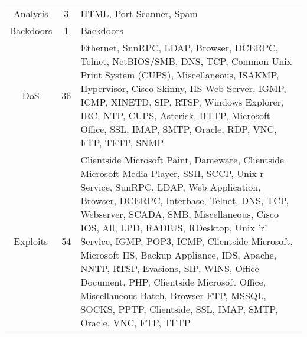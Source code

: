 \begin{table}[htbp]
\begin{tabularx}{\textwidth}{@{}ccX@{}}
		Analysis                        & 3                               & HTML, Port Scanner, Spam                                                                                                                                                                                                                                                                                                                                                                                                                                                                                                                                            \\
		Backdoors                       & 1                               & Backdoors                                                                                                                                                                                                                                                                                                                                                                                                                                                                                                                                                           \\
		DoS                             & 36                              & Ethernet, SunRPC, LDAP, Browser, DCERPC, Telnet, NetBIOS/SMB, DNS, TCP, Common Unix Print System (CUPS), Miscellaneous, ISAKMP, Hypervisor,
		Cisco Skinny, IIS Web Server, IGMP, ICMP, XINETD, SIP, RTSP, Windows Explorer, IRC, NTP, CUPS, Asterisk, HTTP, Microsoft Office, SSL, IMAP, SMTP, Oracle, RDP, VNC, FTP, TFTP, SNMP                                                                                                                                                                                                                                                                                                                                                                                                                                                     \\
		Exploits                        & 54                              & Clientside Microsoft Paint, Dameware, Clientside Microsoft Media Player, SSH, SCCP, Unix r Service, SunRPC, LDAP, Web Application, Browser, DCERPC, Interbase, Telnet, DNS, TCP, Webserver, SCADA, SMB, Miscellaneous, Cisco IOS, All, LPD, RADIUS, RDesktop, Unix 'r' Service, IGMP, POP3, ICMP, Clientside Microsoft, Microsoft IIS, Backup Appliance, IDS, Apache, NNTP, RTSP, Evasions, SIP, WINS, Office Document, PHP, Clientside Microsoft Office, Miscellaneous Batch, Browser FTP, MSSQL, SOCKS, PPTP, Clientside, SSL, IMAP, SMTP, Oracle, VNC, FTP, TFTP \\

\end{tabularx}
\end{table}
